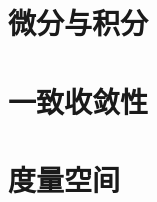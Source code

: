 \chapter{微分与积分}\label{ch01003}

\chapter{一致收敛性}\label{ch01004}

\chapter{度量空间}\label{ch01005}












